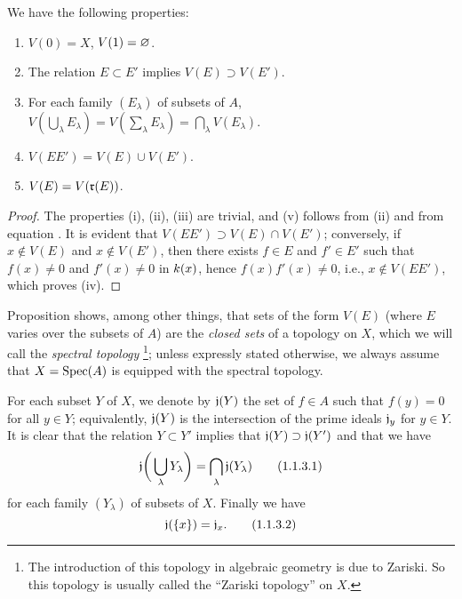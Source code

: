 \begin{prop}[1.1.2]
\label{1.1.1.2}
We have the following properties:
\begin{enumerate}[label=\emph{(\roman*)}]
  \item $V(0)=X$, $V(1)=\varnothing$.
  \item The relation $E\subset E'$ implies $V(E)\supset V(E')$.
  \item For each family $(E_\lambda)$ of subsets of $A$, $V(\bigcup_\lambda E_\lambda)=V(\sum_\lambda E_\lambda)=\bigcap_\lambda V(E_\lambda)$.
  \item $V(EE')=V(E)\cup V(E')$.
  \item $V(E)=V(\mathfrak{r}(E))$.
\end{enumerate}
\end{prop}

\begin{proof}
\label{proof-1.1.1.2}
The properties (i), (ii), (iii) are trivial, and (v) follows from (ii) and from equation .
It is evident that $V(EE')\supset V(E)\cap V(E')$;
conversely, if $x\not\in V(E)$ and $x\not\in V(E')$, then there exists $f\in E$ and $f'\in E'$ such that $f(x)\neq 0$ and $f'(x)\neq 0$ in $k(x)$, hence $f(x)f'(x)\neq 0$, i.e., $x\not\in V(EE')$, which proves (iv).
\end{proof}

Proposition  shows, among other things, that sets of the form $V(E)$ (where $E$ varies over the subsets of $A$) are the \emph{closed sets} of a topology on $X$, which we will call the \emph{spectral topology}
\footnote{The introduction of this topology in algebraic geometry is due to Zariski.
So this topology is usually called the ``Zariski topology'' on $X$.};
unless expressly stated otherwise, we always assume that $X={\mathop{\mathrm{Spec}}\nolimits}(A)$ is equipped with the spectral topology.

\begin{env}[1.1.3]
\label{1.1.1.3}
For each subset $Y$ of $X$, we denote by $\mathfrak{j}(Y)$ the set of $f\in A$ such that $f(y)=0$ for all $y\in Y$;
equivalently, $\mathfrak{j}(Y)$ is the intersection of the prime ideals $\mathfrak{j}_y$ for $y\in Y$.
It is clear that the relation $Y\subset Y'$ implies that $\mathfrak{j}(Y)\supset\mathfrak{j}(Y')$ and that we have
\[
  \mathfrak{j}\bigg(\bigcup_\lambda Y_\lambda\bigg)=\bigcap_\lambda\mathfrak{j}(Y_\lambda)
  \tag{1.1.3.1}
\]
for each family $(Y_\lambda)$ of subsets of $X$.
Finally we have
\[
  \mathfrak{j}(\{x\})=\mathfrak{j}_x.
  \tag{1.1.3.2}
\]
\end{env}

